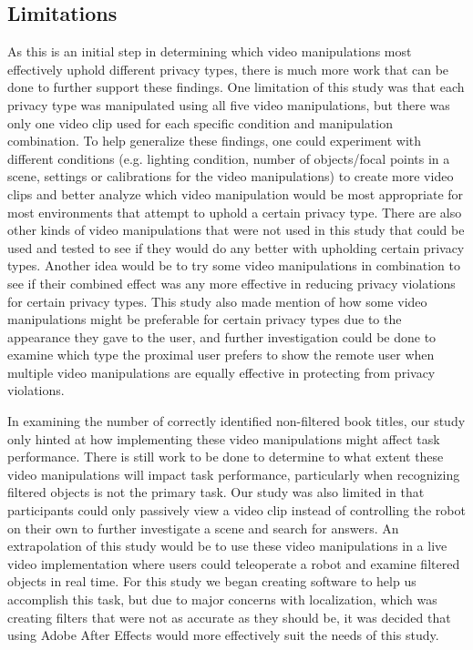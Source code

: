 \documentclass{acm_proc_article-sp}
\begin{document}
\subsection{Limitations}
As this is an initial step in determining which video manipulations most effectively uphold different privacy types, there is much more work that can be done to further support these findings. One limitation of this study was that each privacy type was manipulated using all five video manipulations, but there was only one video clip used for each specific condition and manipulation combination. To help generalize these findings, one could experiment with different conditions (e.g. lighting condition, number of objects/focal points in a scene, settings or calibrations for the video manipulations) to create more video clips and better analyze which video manipulation would be most appropriate for most environments that attempt to uphold a certain privacy type. There are also other kinds of video manipulations that were not used in this study that could be used and tested to see if they would do any better with upholding certain privacy types. Another idea would be to try some video manipulations in combination to see if their combined effect was any more effective in reducing privacy violations for certain privacy types. This study also made mention of how some video manipulations might be preferable for certain privacy types due to the appearance they gave to the user, and further investigation could be done to examine which type the proximal user prefers to show the remote user when multiple video manipulations are equally effective in protecting from privacy violations. 

In examining the number of correctly identified non-filtered book titles, our study only hinted at how implementing these video manipulations might affect task performance. There is still work to be done to determine to what extent these video manipulations will impact task performance, particularly when recognizing filtered objects is not the primary task. Our study was also limited in that participants could only passively view a video clip instead of controlling the robot on their own to further investigate a scene and search for answers. An extrapolation of this study would be to use these video manipulations in a live video implementation where users could teleoperate a robot and examine filtered objects in real time. For this study we began creating software to help us accomplish this task, but due to major concerns with localization, which was creating filters that were not as accurate as they should be, it was decided that using Adobe After Effects would more effectively suit the needs of this study.
\end{document}
